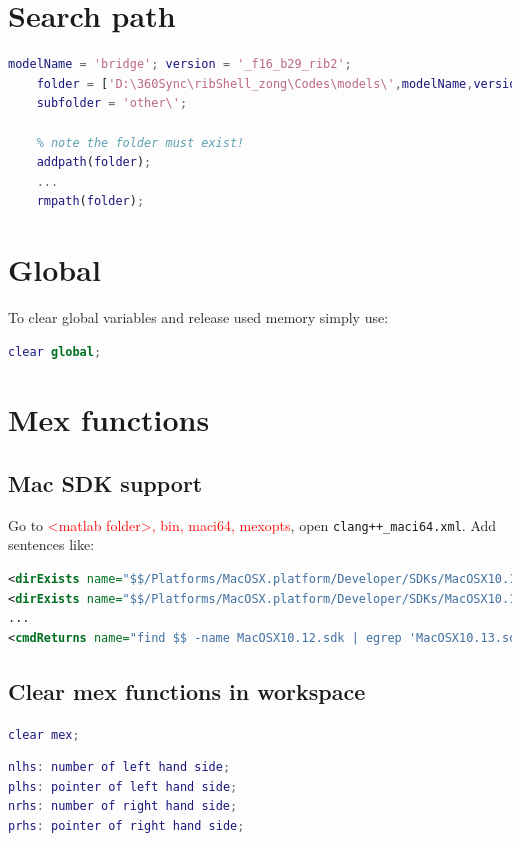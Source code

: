 \documentclass[10pt,a4paper]{article}
\begin{document}
\section{Search path}
\begin{lstlisting}[language=matlab]
	modelName = 'bridge'; version = '_f16_b29_rib2';
	folder = ['D:\360Sync\ribShell_zong\Codes\models\',modelName,version,'\'];
	subfolder = 'other\';
	
	% note the folder must exist!
	addpath(folder);
	...
	rmpath(folder);
\end{lstlisting}

\section{Global}
To clear global variables and release used memory simply use:
\begin{lstlisting}[language=matlab]
clear global;
\end{lstlisting}

\section{Mex functions}
\subsection{Mac SDK support}
Go to \textcolor{red}{<matlab folder>, bin, maci64, mexopts}, open \lstinline{clang++_maci64.xml}.
Add sentences like:

\begin{lstlisting}[language=xml]
<dirExists name="$$/Platforms/MacOSX.platform/Developer/SDKs/MacOSX10.13.sdk" />
<dirExists name="$$/Platforms/MacOSX.platform/Developer/SDKs/MacOSX10.12.sdk" />
...
<cmdReturns name="find $$ -name MacOSX10.12.sdk | egrep 'MacOSX10.13.sdk'" />
\end{lstlisting}

\subsection{Clear mex functions in workspace}
\lstinline[language=matlab]{clear mex;}

\begin{lstlisting}[language=matlab]
nlhs: number of left hand side;
plhs: pointer of left hand side;
nrhs: number of right hand side;
prhs: pointer of right hand side;
\end{lstlisting}
\end{document}

